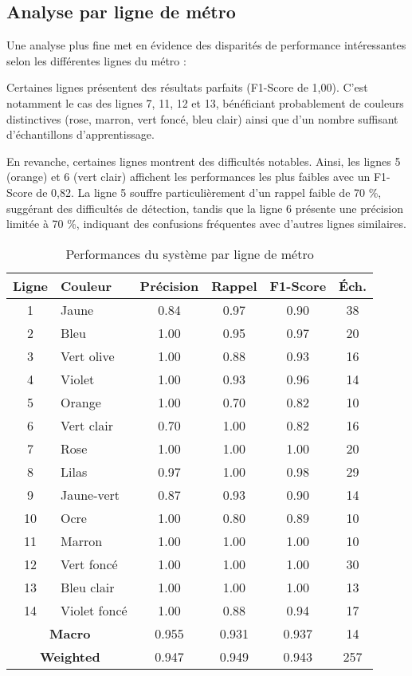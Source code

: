 \documentclass[journal]{IEEEtran}
\begin{document}
\subsection{Analyse par ligne de métro}

Une analyse plus fine met en évidence des disparités de performance intéressantes selon les différentes lignes du métro :

Certaines lignes présentent des résultats parfaits (F1-Score de 1,00). C'est notamment le cas des lignes 7, 11, 12 et 13, bénéficiant probablement de couleurs distinctives (rose, marron, vert foncé, bleu clair) ainsi que d'un nombre suffisant d'échantillons d'apprentissage.

En revanche, certaines lignes montrent des difficultés notables. Ainsi, les lignes 5 (orange) et 6 (vert clair) affichent les performances les plus faibles avec un F1-Score de 0,82. La ligne 5 souffre particulièrement d'un rappel faible de 70 \%, suggérant des difficultés de détection, tandis que la ligne 6 présente une précision limitée à 70 \%, indiquant des confusions fréquentes avec d'autres lignes similaires.

\begin{table}[htbp]
\centering
\caption{Performances du système par ligne de métro}
\label{tab:performances_lignes}
\footnotesize
\begin{tabular}{|c|l|c|c|c|c|}
\hline
\textbf{Ligne} & \textbf{Couleur} & \textbf{Précision} & \textbf{Rappel} & \textbf{F1-Score} & \textbf{Éch.} \\
\hline
1 & Jaune & 0.84 & 0.97 & 0.90 & 38 \\
2 & Bleu & 1.00 & 0.95 & 0.97 & 20 \\
3 & Vert olive & 1.00 & 0.88 & 0.93 & 16 \\
4 & Violet & 1.00 & 0.93 & 0.96 & 14 \\
5 & Orange & 1.00 & 0.70 & 0.82 & 10 \\
6 & Vert clair & 0.70 & 1.00 & 0.82 & 16 \\
7 & Rose & 1.00 & 1.00 & 1.00 & 20 \\
8 & Lilas & 0.97 & 1.00 & 0.98 & 29 \\
9 & Jaune-vert & 0.87 & 0.93 & 0.90 & 14 \\
10 & Ocre & 1.00 & 0.80 & 0.89 & 10 \\
11 & Marron & 1.00 & 1.00 & 1.00 & 10 \\
12 & Vert foncé & 1.00 & 1.00 & 1.00 & 30 \\
13 & Bleu clair & 1.00 & 1.00 & 1.00 & 13 \\
14 & Violet foncé & 1.00 & 0.88 & 0.94 & 17 \\
\hline
\hline
\multicolumn{2}{|c|}{\textbf{Macro}} & 0.955 & 0.931 & 0.937 & 14 \\
\multicolumn{2}{|c|}{\textbf{Weighted}} & 0.947 & 0.949 & 0.943 & 257 \\
\hline
\end{tabular}
\end{table}
\end{document}
